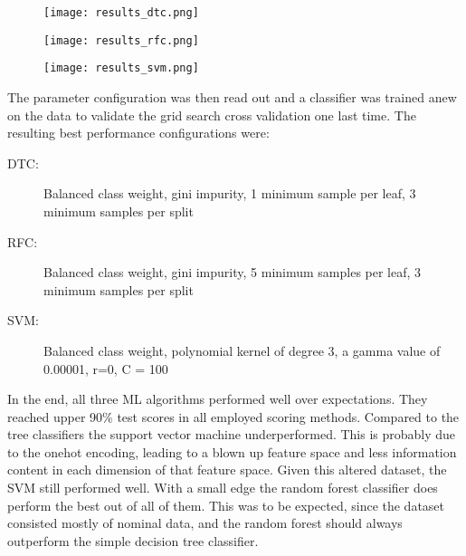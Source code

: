 \begin{figure}
    \centering
    \texttt{[image: results\_dtc.png]}
    \label{fig:dtc_results}
\end{figure}
\begin{figure}
    \centering
    \texttt{[image: results\_rfc.png]}
    \label{fig:rfc_results}
\end{figure}
\begin{figure}
    \centering
    \texttt{[image: results\_svm.png]}
    \label{fig:svm_results}
\end{figure}
\FloatBarrier
The parameter configuration was then read out and a classifier was trained anew on the data to validate the grid search cross validation one last time. The resulting best performance configurations were:
\begin{description}
    \item [DTC:] Balanced class weight, gini impurity, 1 minimum sample per leaf, 3 minimum samples per split
    \item [RFC:] Balanced class weight, gini impurity, 5 minimum samples per leaf, 3 minimum samples per split
    \item [SVM:] Balanced class weight, polynomial kernel of degree 3, a gamma value of 0.00001, r=0, C = 100
\end{description}
In the end, all three ML algorithms performed well over expectations. They reached upper 90\% test scores in all employed scoring methods. Compared to the tree classifiers the support vector machine underperformed. This is probably due to the onehot encoding, leading to a blown up feature space and less information content in each dimension of that feature space. Given this altered dataset, the SVM still performed well. With a small edge the random forest classifier does perform the best out of all of them. This was to be expected, since the dataset consisted mostly of nominal data, and the random forest should always outperform the simple decision tree classifier.\\
